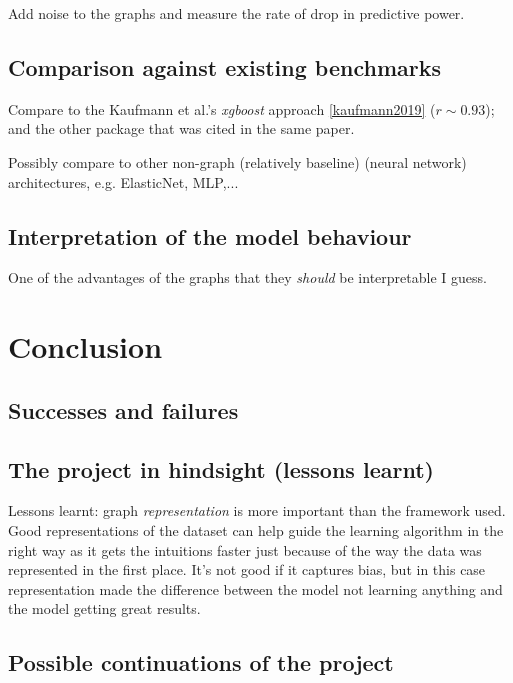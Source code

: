 \documentclass[12pt,a4paper,twoside, openright, hidelinks]{report}
\begin{document}
Add noise to the graphs and measure the rate of drop in predictive power.

\section{Comparison against existing benchmarks}

Compare to the Kaufmann et al.'s \textit{xgboost} approach \ref{kaufmann2019} ($r \sim 0.93$); and the other package that was cited in the same paper.

Possibly compare to other non-graph (relatively baseline) (neural network) architectures, e.g. ElasticNet, MLP,...

\section{Interpretation of the model behaviour}
One of the advantages of the graphs that they \textit{should} be interpretable I guess.

\chapter{Conclusion}


\section{Successes and failures}

\section{The project in hindsight (lessons learnt)}
Lessons learnt: graph \textit{representation} is more important than the framework used. Good representations of the dataset can help guide the learning algorithm in the right way as it gets the intuitions faster just because of the way the data was represented in the first place. It's not good if it captures bias, but in this case representation made the difference between the model not learning anything and the model getting great results.

\section{Possible continuations of the project}
\end{document}
